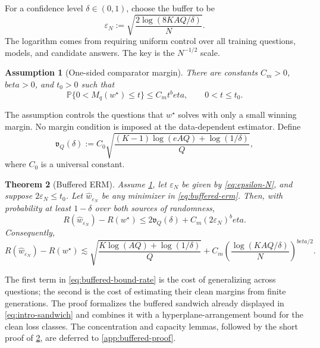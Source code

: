 \documentclass[11pt]{article}
\def\beta{beta}%
\newtheorem{theorem}{Theorem}[section]
\newtheorem{assumption}[theorem]{Assumption}
\newcommand{\Pp}{\mathbb P}
\newcommand{\eps}{\varepsilon}
\begin{document}
For a confidence level $\delta\in(0,1)$, choose the buffer to be
\begin{equation}
\label{eq:epsilon-N}
\eps_N
:=
\sqrt{\frac{2\log(8KAQ/\delta)}{N}}.
\end{equation}
The logarithm comes from requiring uniform control over all training questions, models, and candidate answers.  The key is the $N^{-1/2}$ scale.

\begin{assumption}[One-sided comparator margin]
\label{ass:one-sided-margin}
There are constants $C_m>0$, $\beta>0$, and $t_0>0$ such that
\begin{equation}
\label{eq:one-sided-margin}
\Pp\{0<M_q(w^\star)\le t\}
\le C_m t^\beta,
\qquad 0<t\le t_0.
\end{equation}
\end{assumption}

The assumption controls the questions that $w^\star$ solves with only a small winning margin.  No margin condition is imposed at the data-dependent estimator.  Define
\begin{equation}
\label{eq:vq}
\mathfrak v_Q(\delta)
:=
C_0
\sqrt{
\frac{(K-1)\log(eAQ)+\log(1/\delta)}{Q}
},
\end{equation}
where $C_0$ is a universal constant.

\begin{theorem}[Buffered ERM]
\label{thm:buffered-main}
Assume \cref{ass:one-sided-margin}, let $\eps_N$ be given by \eqref{eq:epsilon-N}, and suppose $2\eps_N\le t_0$.  Let $\widehat w_{\eps_N}$ be any minimizer in \eqref{eq:buffered-erm}.  Then, with probability at least $1-\delta$ over both sources of randomness,
\begin{equation}
\label{eq:buffered-bound-exact}
R(\widehat w_{\eps_N})-R(w^\star)
\le
2\mathfrak v_Q(\delta)
+C_m(2\eps_N)^\beta.
\end{equation}
Consequently,
\begin{equation}
\label{eq:buffered-bound-rate}
R(\widehat w_{\eps_N})-R(w^\star)
\lesssim
\sqrt{\frac{K\log(AQ)+\log(1/\delta)}{Q}}
+
C_m\left(\frac{\log(KAQ/\delta)}{N}\right)^{\beta/2}.
\end{equation}
\end{theorem}

The first term in \eqref{eq:buffered-bound-rate} is the cost of generalizing across questions; the second is the cost of estimating their clean margins from finite generations.  The proof formalizes the buffered sandwich already displayed in \eqref{eq:intro-sandwich} and combines it with a hyperplane-arrangement bound for the clean loss classes.  The concentration and capacity lemmas, followed by the short proof of \cref{thm:buffered-main}, are deferred to \cref{app:buffered-proof}.
\end{document}
